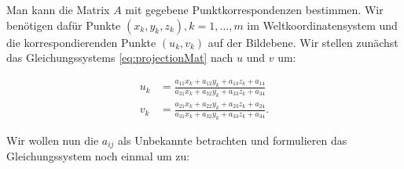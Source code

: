 %

 
Man kann die Matrix $A$ mit gegebene Punktkorrespondenzen bestimmen. Wir benötigen dafür Punkte $(x_k,y_k, z_k), k = 1,\dotsc,m$ im Weltkoordinatensystem und die korrespondierenden Punkte $(u_k, v_k)$ auf der Bildebene.
Wir stellen zunächst das Gleichungssystems \ref{eq:projectionMat} nach $u$ und $v$ um:
 
\[
 \begin{aligned}
 u_k &= \frac{a_{11} x_k +a_{12}y_k + a_{13}z_k + a_{14}}{a_{31} x_k +a_{32}y_k + a_{33}z_k + a_{34}} \\
 v_k &= \frac{a_{21} x_k +a_{22}y_k + a_{23}z_k + a_{24}}{a_{31} x_k +a_{32}y_k + a_{33}z_k + a_{34}}.
 \end{aligned}
\]
 
Wir wollen nun die $a_{ij}$ als Unbekannte betrachten und formulieren das Gleichungssystem noch einmal um zu:
 
